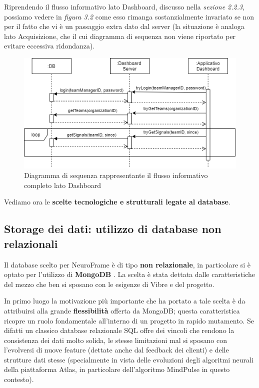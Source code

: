 \noindent Riprendendo il flusso informativo lato Dashboard, discusso nella \emph{sezione 2.2.3}, possiamo vedere in \emph{figura 3.2} come esso rimanga sostanzialmente invariato se non per il fatto che vi è un passaggio extra dato dal server (la situazione è analoga lato Acquisizione, che il cui diagramma di sequenza non viene riportato per evitare eccessiva ridondanza).
\vspace{5mm}
\begin{figure}[H]
  \centering
  \includegraphics[width=1.0\textwidth]{img/diagramma_sequenza_dashboard_completo.png}
  \caption{Diagramma di sequenza rappresentante il flusso informativo completo lato Dashboard}
\end{figure}
\vspace{5mm}
\noindent Vediamo ora le {\bf scelte tecnologiche e strutturali legate al database}.

\subsection{Storage dei dati: utilizzo di database non relazionali}
Il database scelto per NeuroFrame è di tipo {\bf non relazionale}, in particolare si è optato per l'utilizzo di {\bf MongoDB} \cite{what_is_mongoDB}.\newline
La scelta è stata dettata dalle caratteristiche del mezzo che ben si sposano con le esigenze di Vibre e del progetto.\newline

\noindent In primo luogo la motivazione più importante che ha portato a tale scelta è da attribuirsi alla grande {\bf flessibilità} offerta da MongoDB; questa caratteristica ricopre un ruolo fondamentale all'interno di un progetto in rapido mutamento.\newline
Se difatti un classico database relazionale SQL offre dei vincoli che rendono la consistenza dei dati molto solida, le stesse limitazioni mal si sposano con l'evolversi di nuove feature (dettate anche dal feedback dei clienti) e delle strutture dati stesse (specialmente in vista delle evoluzioni degli algoritmi neurali della piattaforma Atlas, in particolare dell'algoritmo MindPulse in questo contesto).\newline

